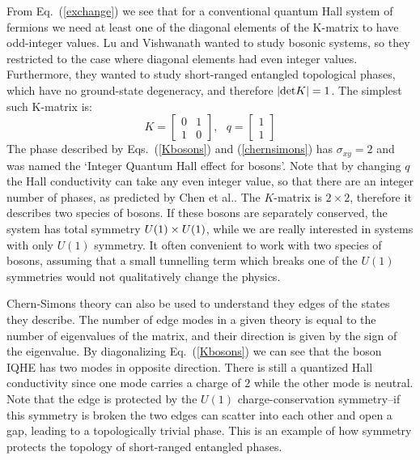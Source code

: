From Eq.~(\ref{exchange}) we see that for a conventional quantum Hall system of fermions we need at least one of the diagonal elements of the K-matrix to have odd-integer values. Lu and Vishwanath wanted to study bosonic systems, so they restricted to the case where diagonal elements had even integer values. Furthermore, they wanted to study short-ranged entangled topological phases, which have no ground-state degeneracy, and therefore $|{\rm det}K|=1$. The simplest such K-matrix is:
\begin{equation}
K=\left[\begin{array}{cc} 0 & 1 \\ 1 & 0\end{array}\right],~~~q=\left[\begin{array}{cc} 1\\ 1 \end{array}\right]
\label{Kbosons}
\end{equation}
The phase described by Eqs.~(\ref{Kbosons}) and (\ref{chernsimons}) has $\sigma_{xy}=2$ and was named the `Integer Quantum Hall effect for bosons'. Note that by changing $q$ the Hall conductivity can take any even integer value, so that there are an integer number of phases, as predicted by Chen et al.\cite{WenScience,WenPRB}. The $K$-matrix is $2\times2$, therefore it describes two species of bosons. If these bosons are separately conserved, the system has total symmetry $U(1)\times U(1)$, while we are really interested in systems with only $U(1)$ symmetry. It often convenient to work with two species of bosons, assuming that a small tunnelling term which breaks one of the $U(1)$ symmetries would not qualitatively change the physics. 

Chern-Simons theory can also be used to understand they edges of the states they describe\cite{Wen_book}. The number of edge modes in a given theory is equal to the number of eigenvalues of the matrix, and their direction is given by the sign of the eigenvalue. By diagonalizing Eq.~(\ref{Kbosons}) we can see that the boson IQHE has two modes in opposite direction. There is still a quantized Hall conductivity since one mode carries a charge of $2$ while the other mode is neutral. Note that the edge is protected by the $U(1)$ charge-conservation symmetry--if this symmetry is broken the two edges can scatter into each other and open a gap, leading to a topologically trivial phase. This is an example of how symmetry protects the topology of short-ranged entangled phases.

